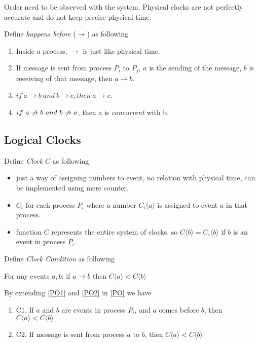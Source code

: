 \documentclass[12pt,a4paper,oneside]{article}
\begin{document}
Order need to be observed with the system.
Physical clocks are not perfectly accurate and do not keep precise physical time\cite{l}.

Define \textit{happens before} ($\rightarrow$) as following

\begin{enumerate}
  \item \label{PO1} Inside a process, $\rightarrow$ is just like physical time.
  \item \label{PO2} If message is sent from process $P_i$ to $P_j$,
  $a$ is the sending of the message,  $b$ is receiving of that message, then $a \rightarrow b$.
  \item $if\ a \rightarrow b\ and\ b \rightarrow c, then\ a \rightarrow c$.
  \item $if\ a \centernot\rightarrow b\ and\ b \centernot\rightarrow a$, then a is \textit{concurrent} with b.
\end{enumerate}

\subsection{Logical Clocks}

Define \textit{Clock} $C$ as following\cite{l}

\begin{itemize}
  \item just a way of assigning numbers to event, no relation with physical time, can be implemented using mere counter.
  \item $C_i$ for each process $P_i$ where a number $C_i\langle a \rangle$ is assigned to event $a$ in that process.
  \item function $C$ represents the entire system of clocks, so $C\langle b \rangle = C_i \langle b \rangle$ if $b$ is an event in process $P_i$.
\end{itemize}

Define \textit{Clock Condition} as following

\medskip

For any events $a, b$: if $a \rightarrow b$ then $C\langle a \rangle < C\langle b \rangle$

\medskip

By extending \ref{PO1} and \ref{PO2} in \ref{PO} we have

\begin{enumerate}
  \item \label{C1} C1. If $a$ and $b$ are events in process $P_i$, and $a$ comes before $b$, then $C\langle a \rangle < C\langle b \rangle$\cite{l}
  \item \label{C2} C2. If message is sent from process $a$ to $b$, then $C\langle a \rangle < C\langle b \rangle$\
\end{enumerate}
\end{document}
